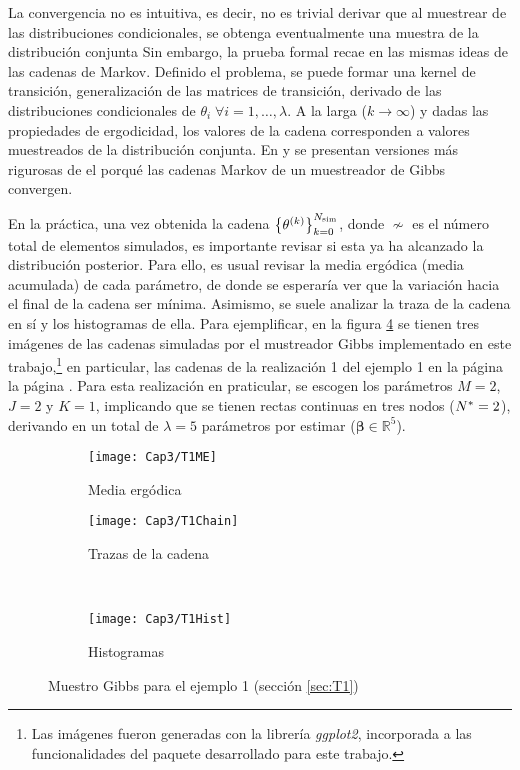 \documentclass[../Main/Main.tex]{subfiles}
\begin{document}
La convergencia no es intuitiva, es decir, no es trivial derivar que al muestrear de las distribuciones condicionales, se obtenga eventualmente  una muestra de la distribución conjunta  Sin embargo, la prueba formal recae en  las mismas ideas de las cadenas de Markov. Definido el problema, se puede formar una kernel de transición, generalización de las matrices de transición, derivado de las  distribuciones condicionales de $\theta_i\;\forall i = 1,\ldots,\lambda$. A la larga ($k \rightarrow \infty$) y dadas las propiedades de ergodicidad, los valores de la cadena corresponden a valores muestreados de la distribución conjunta. En \citet{casella1992explaining} y \citet{tierney1994markov} se presentan versiones más rigurosas de el porqué las cadenas Markov de un muestreador de Gibbs convergen. 

En la práctica, una vez obtenida la cadena $\left\{\theta^{(k)}\right\}_{k=0}^{N_{\text{sim}}}$, donde $\nsim$ es el número total de elementos simulados, es importante revisar si esta ya ha alcanzado la distribución posterior. Para ello, es usual revisar la media ergódica (media acumulada) de cada parámetro, de donde se esperaría ver que la variación hacia el final de la cadena ser mínima. Asimismo, se suele analizar la traza de la cadena en sí y los histogramas de ella. Para ejemplificar, en la figura \ref{fig:GibbsSamplerSimulado} se tienen tres imágenes de las cadenas simuladas por el mustreador Gibbs implementado en este trabajo,\footnote{Las imágenes fueron generadas con la librería \textit{ggplot2}, incorporada a las funcionalidades del paquete desarrollado para este trabajo.} en particular, las cadenas de la realización 1 del ejemplo 1 en la página la página \pageref{fig:T1M1}. Para esta realización en praticular, se escogen los parámetros $M = 2$, $J = 2$ y $K = 1$, implicando que se tienen rectas continuas en tres nodos ($N^* = 2$), derivando en un total de $\lambda = 5$ parámetros por estimar ($\bm{\beta}\in\mathbb{R}^5$). 
\begin{figure}[h]
    \centering
    \begin{subfigure}[b]{0.45\textwidth}
        \texttt{[image: Cap3/T1ME]}
        \caption{Media ergódica}
        \label{img:MedErg}
    \end{subfigure}
	\quad
    \begin{subfigure}[b]{0.45\textwidth}
        \texttt{[image: Cap3/T1Chain]}
        \caption{Trazas de la cadena}
        \label{img:GibbsChain}
    \end{subfigure}
	\\
    \centering
    \begin{subfigure}[b]{0.45\textwidth}
        \texttt{[image: Cap3/T1Hist]}
        \caption{Histogramas}
        \label{img:GibbsHist}
    \end{subfigure}
    \caption{Muestro Gibbs para el ejemplo 1 (sección \ref{sec:T1})}\label{fig:GibbsSamplerSimulado}
\end{figure}
\end{document}
